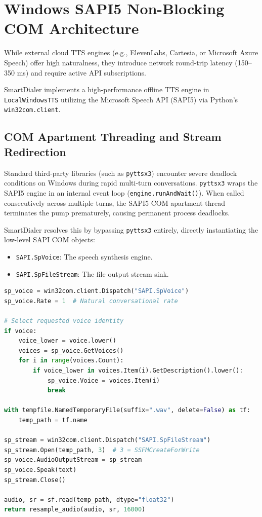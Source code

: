 \documentclass[11pt,a4paper,titlepage]{report}
\begin{document}
\section{Windows SAPI5 Non-Blocking COM Architecture}
While external cloud TTS engines (e.g., ElevenLabs, Cartesia, or Microsoft Azure Speech) offer high naturalness, they introduce network round-trip latency (150--350 ms) and require active API subscriptions. 

SmartDialer implements a high-performance offline TTS engine in \texttt{LocalWindowsTTS} utilizing the Microsoft Speech API (SAPI5) via Python's \texttt{win32com.client}.

\subsection{COM Apartment Threading and Stream Redirection}
Standard third-party libraries (such as \texttt{pyttsx3}) encounter severe deadlock conditions on Windows during rapid multi-turn conversations. \texttt{pyttsx3} wraps the SAPI5 engine in an internal event loop (\texttt{engine.runAndWait()}). When called consecutively across multiple turns, the SAPI5 COM apartment thread terminates the pump prematurely, causing permanent process deadlocks.

SmartDialer resolves this by bypassing \texttt{pyttsx3} entirely, directly instantiating the low-level SAPI COM objects:
\begin{itemize}
    \item \texttt{SAPI.SpVoice}: The speech synthesis engine.
    \item \texttt{SAPI.SpFileStream}: The file output stream sink.
\end{itemize}

\begin{lstlisting}[language=Python, caption={Non-blocking SAPI5 COM speech synthesis.}]
sp_voice = win32com.client.Dispatch("SAPI.SpVoice")
sp_voice.Rate = 1  # Natural conversational rate

# Select requested voice identity
if voice:
    voice_lower = voice.lower()
    voices = sp_voice.GetVoices()
    for i in range(voices.Count):
        if voice_lower in voices.Item(i).GetDescription().lower():
            sp_voice.Voice = voices.Item(i)
            break

with tempfile.NamedTemporaryFile(suffix=".wav", delete=False) as tf:
    temp_path = tf.name

sp_stream = win32com.client.Dispatch("SAPI.SpFileStream")
sp_stream.Open(temp_path, 3)  # 3 = SSFMCreateForWrite
sp_voice.AudioOutputStream = sp_stream
sp_voice.Speak(text)
sp_stream.Close()

audio, sr = sf.read(temp_path, dtype="float32")
return resample_audio(audio, sr, 16000)
\end{lstlisting}
\end{document}
